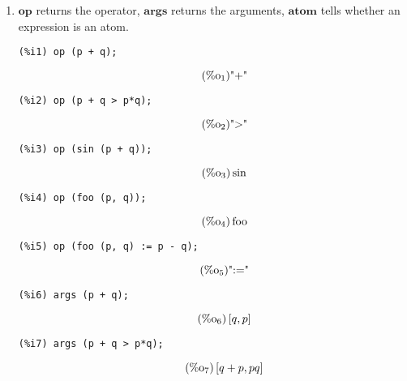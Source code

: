 \documentclass[12pt,leqno]{article}
\begin{document}
\begin{enumerate}
\item $\mathbf{op}$ returns the operator, $\mathbf{args}$ returns the arguments,
$\mathbf{atom}$ tells whether an expression is an atom.
\begin{verbatim}
(%i1) op (p + q);
\end{verbatim}
\begin{equation}
\tag{$\mathop{\mathrm{\%o}}_{1}$}\mbox{"+"}
\label{eq:doc-group1-code10-1-1}
\end{equation}
\begin{verbatim}
(%i2) op (p + q > p*q);
\end{verbatim}
\begin{equation}
\tag{$\mathop{\mathrm{\%o}}_{2}$}\mbox{"\textgreater "}
\label{eq:doc-group1-code10-2-1}
\end{equation}
\begin{verbatim}
(%i3) op (sin (p + q));
\end{verbatim}
\begin{equation}
\tag{$\mathop{\mathrm{\%o}}_{3}$}\sin
\label{eq:doc-group1-code10-3-1}
\end{equation}
\begin{verbatim}
(%i4) op (foo (p, q));
\end{verbatim}
\begin{equation}
\tag{$\mathop{\mathrm{\%o}}_{4}$}\mathop{\mathrm{foo}}
\label{eq:doc-group1-code10-4-1}
\end{equation}
\begin{verbatim}
(%i5) op (foo (p, q) := p - q);
\end{verbatim}
\begin{equation}
\tag{$\mathop{\mathrm{\%o}}_{5}$}\mbox{":="}
\label{eq:doc-group1-code10-5-1}
\end{equation}
\begin{verbatim}
(%i6) args (p + q);
\end{verbatim}
\begin{equation}
\tag{$\mathop{\mathrm{\%o}}_{6}$}\left[q, p\right]
\label{eq:doc-group1-code10-6-1}
\end{equation}
\begin{verbatim}
(%i7) args (p + q > p*q);
\end{verbatim}
\begin{equation}
\tag{$\mathop{\mathrm{\%o}}_{7}$}\left[q+p, p q\right]
\label{eq:doc-group1-code10-7-1}
\end{equation}

\end{enumerate}
\end{document}
